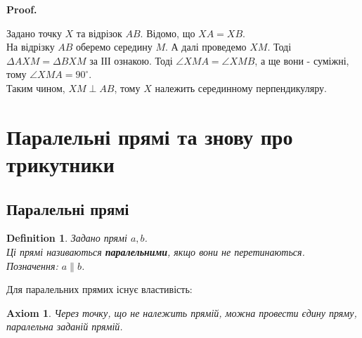 \documentclass[a4paper, 10pt]{article}
\makeatletter
\def\qed{$\blacksquare$}
\theoremstyle{theoremdd}
\theoremstyle{theoremdd}
\newtheorem{axiom}{Axiom}
\theoremstyle{theoremdd}
\newtheorem{definition}[theorem]{Definition}
\theoremstyle{theoremdd}
\theoremstyle{theoremdd}
\theoremstyle{theoremdd}
\theoremstyle{theoremdd}
\theoremstyle{theoremdd}
\theoremstyle{theoremdd}
\renewenvironment{proof}[1][Proof.\\]{\par
\pushQED{\hfill \qed}%
\normalfont \topsep6\p@\@plus6\p@\relax
\trivlist
\item\relax
{\bfseries
#1\@addpunct{.}}\hspace\labelsep\ignorespaces
}{%
\popQED\endtrivlist\@endpefalse
}
\makeatother
\begin{document}
\begin{proof}
Задано точку $X$ та відрізок $AB$. Відомо, що $XA =XB$.\\
На відрізку $AB$ оберемо середину $M$. А далі проведемо $XM$. Тоді $\Delta AXM = \Delta BXM$ за ІІІ ознакою. Тоді $\angle XMA = \angle XMB$, а ще вони - суміжні, тому $\angle XMA = 90^\circ$.\\
Таким чином, $XM \perp AB$, тому $X$ належить серединному перпендикуляру.
\begin{figure}[H]
\centering
{}
\end{figure}
\end{proof}
\newpage

\section{Паралельні прямі та знову про трикутники}
\subsection{Паралельні прямі}
\begin{definition}
Задано прямі $a,b$.\\
Ці прямі називаються \textbf{паралельними}, якщо вони не перетинаються.\\
Позначення: $a \parallel b$.
\begin{figure}[H]
\centering
{}
\end{figure}
\end{definition}

Для паралельних прямих існує властивість:
\begin{axiom}
Через точку, що не належить прямій, можна провести єдину пряму, паралельна заданій прямій.
\end{axiom}
\end{document}
